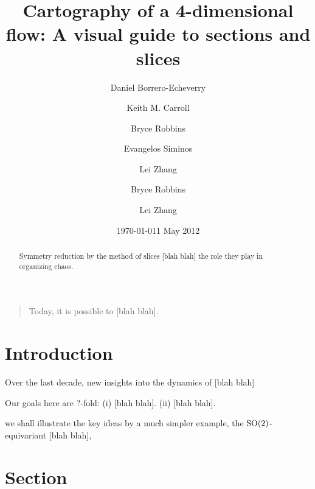 \documentclass[aip,cha,reprint,
secnumarabic,
nofootinbib, tightenlines,
nobibnotes, showkeys, showpacs,
groupedaddress
]{revtex4-1}
\begin{document}
\title[Low-dimensional cartography]
{Cartography of a 4-dimensional flow: A visual guide to sections and slices}

    \ifdraft
\author{Daniel Borrero-Echeverry}
\author{Keith M. Carroll}
\author{Bryce Robbins}
\author{Evangelos Siminos}
\author{Lei Zhang}
\date{\today}
    \else
\author{Bryce Robbins}
\author{Lei Zhang}
\date{1 May 2012}
   \fi


    \begin{abstract}
Symmetry reduction by the method of slices [blah blah]
the role they play in organizing chaos.
    \end{abstract}

\maketitle

    \begin{quotation}
Today, it is possible to  [blah blah].
    \end{quotation}

\section{Introduction}
\label{s:intro}

Over the last decade, new insights into the dynamics of  [blah blah]

Our goals here are ?-fold:
(i)  [blah blah].
(ii) [blah blah].

we shall illustrate the key ideas by a much
simpler example, the $\textrm{SO}(2)$-equivariant  [blah blah],

\section{Section}
\label{s:cut}
\end{document}
